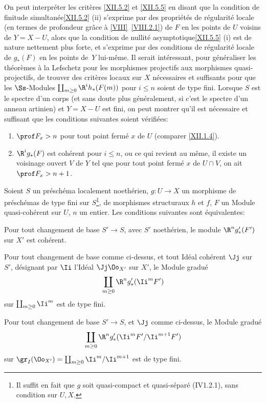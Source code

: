 \begin{remarque} \label{XII.5.6}
On peut interpr\'eter les crit\`eres \ref{XII.5.2} et \ref{XII.5.5} en disant que la \og condition de finitude simultan\'ee\fg \ref{XII.5.2} (ii) s'exprime par des propri\'et\'es de r\'egularit\'e locale (en termes de profondeur gr\^ace \`a \ref{VIII}~\ref{VIII.2.1}) de $F$ en les points de $U$ voisins de $Y=X- U$, alors que la \og condition de nullit\'e asymptotique\fg \ref{XII.5.5} (i) est de nature nettement plus forte, et s'exprime par des conditions de r\'egularit\'e locale de $g_\ast(F)$ en les points de~$Y$ lui-m\^eme. Il serait int\'eressant, pour g\'en\'eraliser les th\'eor\`emes \`a la Lefschetz pour les morphismes projectifs aux morphismes quasi-projectifs, de trouver des crit\`eres locaux sur $X$ n\'ecessaires et suffisants pour que les $\Ss$-Modules $\coprod_{m\geq 0} \R^ih_\ast(F(m))$ pour $i\leq n$ soient de type fini. Lorsque $S$ est le spectre d'un corps (et sans doute plus g\'en\'eralement, si c'est le spectre d'un anneau artinien) et $Y=X- U$ est fini, on peut montrer qu'il est n\'ecessaire et suffisant que les conditions suivantes soient v\'erifi\'ees:
\begin{enumerate}
\item[\textup{1\noo)}] $\prof F_x >n$ pour tout point ferm\'e $x$ de $U$ (comparer \ref{XII.1.4}).
\item[\textup{2\noo)}] $\R^ig_\ast(F)$ est coh\'erent pour $i\leq n$, ou ce qui revient au m\^eme, il existe un voisinage ouvert $V$ de $Y$ tel que pour tout point ferm\'e $x$ de $U\cap V$, on ait $\prof F_x >n+1$.
\end{enumerate}
\end{remarque}

\begin{proposition} \label{XII.5.7}
Soient $S$ un pr\'esch\'ema localement noeth\'erien, $g:U\to X$ un morphisme de pr\'esch\'emas de type fini sur $S$\footnote{Il suffit en fait que $g$ soit quasi-compact et quasi-s\'epar\'e (\textup{\EGA IV1.2.1}), sans condition sur $U, X$.}, de morphismes structuraux $h$ et $f$, $F$ un Module quasi-coh\'erent sur $U$, $n$ un entier. Les conditions suivantes sont \'equivalentes:
\begin{enumeratei}
\item
Pour tout changement de base $S'\to S$, avec $S'$ noeth\'erien, le module $\R^ng'_\ast(F')$ sur $X'$ est coh\'erent.
\item
Pour tout changement de base comme ci-dessus, et tout Id\'eal coh\'erent $\Jj$ sur~$S'$, d\'esignant par $\Ii$ l'Id\'eal $\Jj\Oo_{X'}$ sur $X'$, le Module gradu\'e
\[
\coprod_{m\geq 0} \R^ng'_\ast(\Ii^mF')
\]
sur $\coprod_{m\geq 0} \Ii^m$ est de type fini.
\item
Pour tout changement de base $S'\to S$, et $\Jj$ comme ci-dessus, le Module gradu\'e
\[
\coprod_{m\geq 0} \R^ng'_\ast(\Ii^mF'/\Ii^{m+1}F')
\]
sur $\gr_I(\Oo_{X'})=\coprod_{m\geq 0} \Ii^m/\Ii^{m+1}$ est de type fini.
\end{enumeratei}
\end{proposition}

